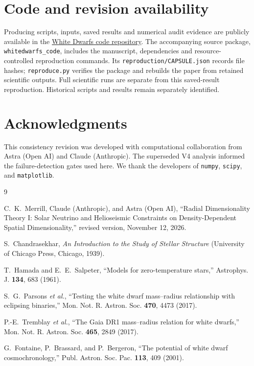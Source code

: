 \documentclass[twocolumn,prd,superscriptaddress,nofootinbib]{revtex4-2}
\begin{document}
\section*{Code and revision availability}
Producing scripts, inputs, saved results and numerical audit evidence are
publicly available in the \href{https://github.com/chrismerrill1974/whitedwarfs_code}{White Dwarfs code repository}.
The accompanying source package, \nolinkurl{whitedwarfs_code}, includes the
manuscript, dependencies and resource-controlled reproduction commands.
Its \texttt{reproduction/CAPSULE.json} records file hashes;
\texttt{reproduce.py} verifies the package and rebuilds the paper from retained
scientific outputs. Full scientific runs are separate from this saved-result
reproduction. Historical scripts and results remain separately identified.

\section*{Acknowledgments}

This consistency revision was developed with computational collaboration
from Astra (Open AI) and Claude (Anthropic). The superseded V4 analysis
informed the failure-detection gates used here. We thank the developers of
\texttt{numpy}, \texttt{scipy}, and \texttt{matplotlib}.

\begin{thebibliography}{9}

 C.~K.~Merrill, Claude (Anthropic), and Astra (Open AI),
``Radial Dimensionality Theory I: Solar Neutrino and Helioseismic Constraints on Density-Dependent Spatial Dimensionality,''
revised version, November 12, 2026.

S.~Chandrasekhar,
\emph{An Introduction to the Study of Stellar Structure}
(University of Chicago Press, Chicago, 1939).

T.~Hamada and E.~E.~Salpeter,
``Models for zero-temperature stars,''
Astrophys. J. \textbf{134}, 683 (1961).

S.~G.~Parsons \textit{et al.},
``Testing the white dwarf mass--radius relationship with eclipsing
binaries,''
Mon. Not. R. Astron. Soc. \textbf{470}, 4473 (2017).

P.-E.~Tremblay \textit{et al.},
``The Gaia DR1 mass--radius relation for white dwarfs,''
Mon. Not. R. Astron. Soc. \textbf{465}, 2849 (2017).

G.~Fontaine, P.~Brassard, and P.~Bergeron,
``The potential of white dwarf cosmochronology,''
Publ. Astron. Soc. Pac. \textbf{113}, 409 (2001).

\end{thebibliography}
\end{document}
